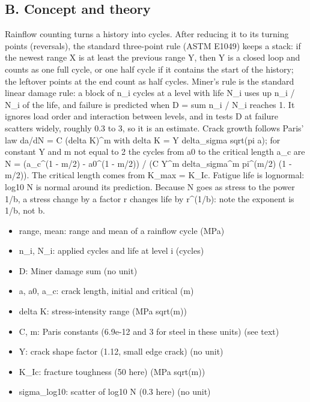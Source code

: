 \documentclass[11pt,a4paper]{article}
\begin{document}
\subsection*{B. Concept and theory}
Rainflow counting turns a history into cycles. After reducing it to its turning points (reversals), the standard three-point rule (ASTM E1049) keeps a stack: if the newest range X is at least the previous range Y, then Y is a closed loop and counts as one full cycle, or one half cycle if it contains the start of the history; the leftover points at the end count as half cycles. Miner's rule is the standard linear damage rule: a block of n\_i cycles at a level with life N\_i uses up n\_i / N\_i of the life, and failure is predicted when D = sum n\_i / N\_i reaches 1. It ignores load order and interaction between levels, and in tests D at failure scatters widely, roughly 0.3 to 3, so it is an estimate. Crack growth follows Paris' law da/dN = C (delta K)\textasciicircum{}m with delta K = Y delta\_sigma sqrt(pi a); for constant Y and m not equal to 2 the cycles from a0 to the critical length a\_c are N = (a\_c\textasciicircum{}(1 - m/2) - a0\textasciicircum{}(1 - m/2)) / (C Y\textasciicircum{}m delta\_sigma\textasciicircum{}m pi\textasciicircum{}(m/2) (1 - m/2)). The critical length comes from K\_max = K\_Ic. Fatigue life is lognormal: log10 N is normal around its prediction. Because N goes as stress to the power 1/b, a stress change by a factor r changes life by r\textasciicircum{}(1/b): note the exponent is 1/b, not b.

\begin{itemize}[nosep]
\item range, mean: range and mean of a rainflow cycle (MPa)
\item n\_i, N\_i: applied cycles and life at level i (cycles)
\item D: Miner damage sum (no unit)
\item a, a0, a\_c: crack length, initial and critical (m)
\item delta K: stress-intensity range (MPa sqrt(m))
\item C, m: Paris constants (6.9e-12 and 3 for steel in these units) (see text)
\item Y: crack shape factor (1.12, small edge crack) (no unit)
\item K\_Ic: fracture toughness (50 here) (MPa sqrt(m))
\item sigma\_log10: scatter of log10 N (0.3 here) (no unit)
\end{itemize}
\end{document}
